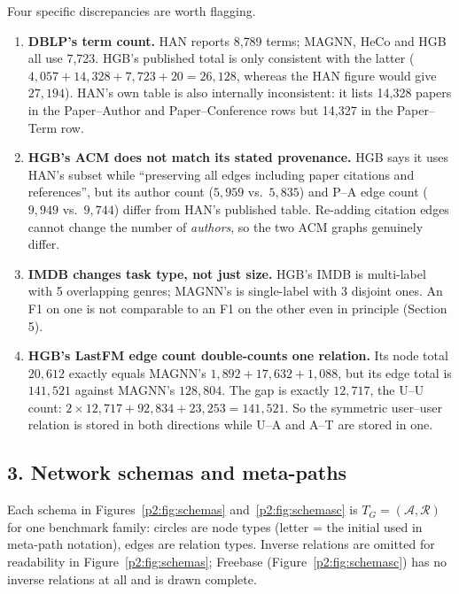 \noindent Four specific discrepancies are worth flagging.
\begin{enumerate}\itemsep2pt
\item \textbf{DBLP's term count.} HAN reports 8{,}789 terms; MAGNN, HeCo and HGB all use 7{,}723.
  HGB's published total is only consistent with the latter
  ($4{,}057+14{,}328+7{,}723+20=26{,}128$, whereas the HAN figure would give $27{,}194$). HAN's own
  table is also internally inconsistent: it lists 14{,}328 papers in the Paper--Author and
  Paper--Conference rows but 14{,}327 in the Paper--Term row.
\item \textbf{HGB's ACM does not match its stated provenance.} HGB says it uses HAN's subset while
  ``preserving all edges including paper citations and references'', but its author count
  ($5{,}959$ vs.\ $5{,}835$) and P--A edge count ($9{,}949$ vs.\ $9{,}744$) differ from HAN's
  published table. Re-adding citation edges cannot change the number of \emph{authors}, so the two
  ACM graphs genuinely differ.
\item \textbf{IMDB changes task type, not just size.} HGB's IMDB is multi-label with 5 overlapping
  genres; MAGNN's is single-label with 3 disjoint ones. An F1 on one is not comparable to an F1 on
  the other even in principle (Section 5).
\item \textbf{HGB's LastFM edge count double-counts one relation.} Its node total $20{,}612$
  exactly equals MAGNN's $1{,}892+17{,}632+1{,}088$, but its edge total is $141{,}521$ against
  MAGNN's $128{,}804$. The gap is exactly $12{,}717$, the U--U count:
  $2\times12{,}717+92{,}834+23{,}253=141{,}521$. So the symmetric user--user relation is stored in
  both directions while U--A and A--T are stored in one.
\end{enumerate}

\subsection*{3. Network schemas and meta-paths}

Each schema in Figures~\ref{p2:fig:schemas} and~\ref{p2:fig:schemasc} is
$T_G=(\mathcal{A},\mathcal{R})$ for one benchmark family: circles are node types (letter = the
initial used in meta-path notation), edges are relation types. Inverse relations are omitted for
readability in Figure~\ref{p2:fig:schemas}; Freebase (Figure~\ref{p2:fig:schemasc}) has no
inverse relations at all and is drawn complete.


